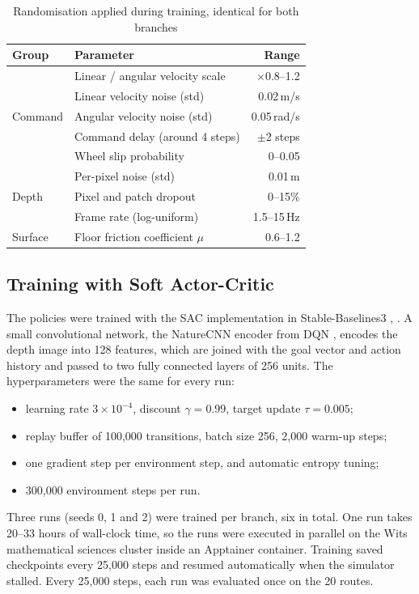 \begin{table}[t]
\caption{Randomisation applied during training, identical for both branches}
\label{tab:randomisation}
\centering
\footnotesize
\begin{tabular}{@{}llr@{}}
\toprule
Group & Parameter & Range \\
\midrule
\multirow{5}{*}{Command} & Linear / angular velocity scale & $\times$0.8--1.2 \\
 & Linear velocity noise (std) & 0.02\,m/s \\
 & Angular velocity noise (std) & 0.05\,rad/s \\
 & Command delay (around 4 steps) & $\pm$2 steps \\
 & Wheel slip probability & 0--0.05 \\
\midrule
\multirow{3}{*}{Depth} & Per-pixel noise (std) & 0.01\,m \\
 & Pixel and patch dropout & 0--15\% \\
 & Frame rate (log-uniform) & 1.5--15\,Hz \\
\midrule
Surface & Floor friction coefficient $\mu$ & 0.6--1.2 \\
\bottomrule
\end{tabular}
\end{table}

\subsection{Training with Soft Actor-Critic}
The policies were trained with the SAC implementation in Stable-Baselines3
\cite{haarnoja2018sac}, \cite{raffin2021sb3}. A small convolutional network, the
NatureCNN encoder from DQN \cite{mnih2015dqn}, encodes the depth image into 128 features, which are joined with the goal vector and action history and passed to
two fully connected layers of 256 units. The hyperparameters were the same for every run:
\begin{itemize}
\item learning rate $3\times10^{-4}$, discount $\gamma=0.99$, target update $\tau=0.005$;
\item replay buffer of 100{,}000 transitions, batch size 256, 2{,}000 warm-up steps;
\item one gradient step per environment step, and automatic entropy tuning;
\item 300{,}000 environment steps per run.
\end{itemize}

Three runs (seeds 0, 1 and 2) were trained per branch, six in total. One run takes 20--33 hours
of wall-clock time, so the runs were executed in parallel on the Wits mathematical sciences
cluster inside an Apptainer container. Training saved checkpoints every 25{,}000 steps and
resumed automatically when the simulator stalled. Every 25{,}000 steps, each run was evaluated
once on the 20 routes.

